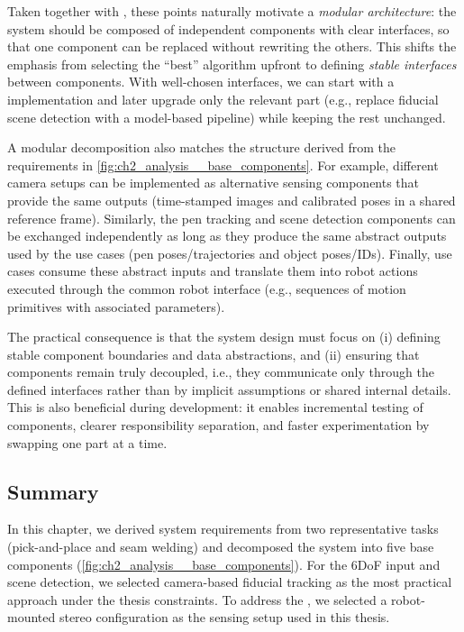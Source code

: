 Taken together with , these points naturally motivate a \emph{modular architecture}: the system should be composed of independent components with clear interfaces, so that one component can be replaced without rewriting the others. This shifts the emphasis from selecting the “best” algorithm upfront to defining \emph{stable interfaces} between components. With well-chosen interfaces, we can start with a \DIFdelbegin {}\DIFdelend \DIFaddbegin {}\DIFaddend implementation and later upgrade only the relevant part (e.g., replace fiducial scene detection with a model-based pipeline\DIFaddbegin {}\DIFaddend ) while keeping the rest unchanged.

A modular decomposition also matches the structure derived from the requirements in \autoref{fig:ch2_analysis__base_components}. For example, different camera setups can be implemented as alternative sensing components that provide the same outputs (time-stamped images and calibrated poses in a shared reference frame). Similarly, the pen tracking and scene detection components can be exchanged independently as long as they produce the same abstract outputs used by the use cases (pen poses/trajectories and object poses/IDs). Finally, use cases consume these abstract inputs and translate them into robot actions executed through the common robot interface (e.g., sequences of motion primitives with associated parameters).

The practical consequence is that the system design must focus on (i) defining stable component boundaries and data abstractions, and (ii) ensuring that components remain truly decoupled, i.e., they communicate only through the defined interfaces rather than by implicit assumptions or shared internal details. This is also beneficial during development: it enables incremental testing of components, clearer responsibility separation, and faster experimentation by swapping one part at a time.

\subsection{Summary} \label{subsec:ch2_analysis_summary}

In this chapter, we derived system requirements from two representative tasks (pick-and-place and seam welding) and decomposed the system into five base components (\autoref{fig:ch2_analysis__base_components}). For the 6DoF input and scene detection, we selected camera-based fiducial tracking as the most practical approach under the thesis constraints. \DIFaddbegin {}\DIFaddend To address the \DIFdelbegin {}\DIFdelend \DIFaddbegin {}\DIFaddend , we selected a robot-mounted stereo configuration as the sensing setup used in this thesis.


